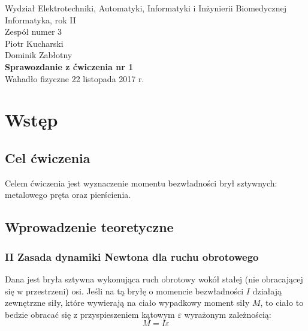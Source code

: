 \documentclass[a4paper,12pts]{article}
\begin{document}
	\thispagestyle{empty}
	\begin{flushleft}
		Wydział Elektrotechniki, Automatyki, Informatyki i Inżynierii Biomedycznej \\
		Informatyka, rok II \\
		Zespół numer 3 \\
		Piotr Kucharski \\
		Dominik Zabłotny \\
		\vspace*{\fill}
		{\large \textbf{Sprawozdanie z ćwiczenia nr 1} } \\
		Wahadło fizyczne		
		\vfill	
		22 listopada 2017 r.
	\end{flushleft}
	
	\newpage
	
	
	\section{Wstęp}
	\subsection{Cel ćwiczenia}
	Celem ćwiczenia jest wyznaczenie momentu bezwładności brył sztywnych: metalowego pręta oraz pierścienia.
	
	\subsection{Wprowadzenie teoretyczne}
	\subsubsection{II Zasada dynamiki Newtona dla ruchu obrotowego}
	Dana jest bryła sztywna wykonująca ruch obrotowy wokół stałej (nie obracającej się w przestrzeni) osi. Jeśli na tą bryłę o momencie bezwładności $I$ działają zewnętrzne siły, które wywierają na ciało wypadkowy moment siły $M$, to ciało to bedzie obracać się z przyspieszeniem kątowym $\varepsilon$ wyrażonym zależnością:
	\begin{equation}
		M = I \varepsilon
	\end{equation} 
	
	
\end{document}
